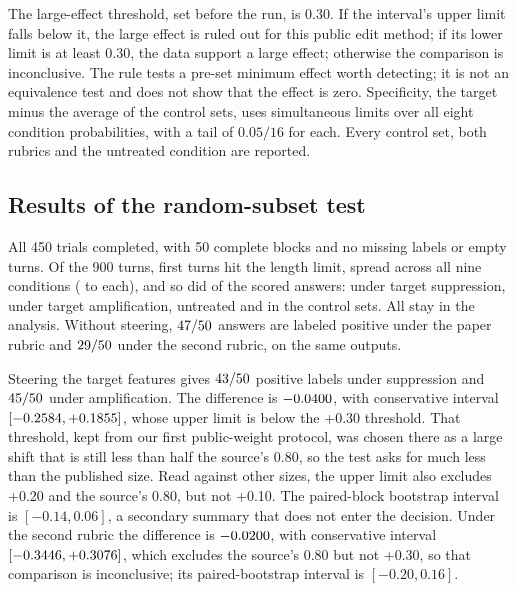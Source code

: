 The large-effect threshold, set before the run, is 0.30. If the interval's
upper limit falls below it, the large effect is ruled out for this public
edit method; if its lower limit is at least 0.30, the data support a large
effect; otherwise the comparison is inconclusive. The rule tests a pre-set
minimum effect worth detecting; it is not an equivalence test and does not
show that the effect is zero. Specificity, the target minus the average of
the control sets, uses simultaneous limits over all eight condition
probabilities, with a tail of $0.05/16$ for each. Every control set, both
rubrics and the untreated condition are reported.

\subsection{Results of the random-subset test}
\label{sec:ensemble-results}

All 450 trials completed, with 50 complete blocks and no missing labels or
empty turns. Of the 900 turns, \SteeringTruncContinuationCapped{} first turns
hit the length limit, spread across all nine conditions
(\SteeringTruncContinuationArmLow{} to \SteeringTruncContinuationArmHigh{}
each), and so did \SteeringTruncAnswerCapped{} of the scored answers:
\SteeringTruncTargetSuppressionCapped{} under target suppression,
\SteeringTruncTargetAmplificationCapped{} under target amplification,
\SteeringTruncZeroCapped{} untreated and \SteeringTruncControlCapped{} in the
control sets. All stay in the analysis. Without steering,
$47{}/50{}$ answers are labeled
positive under the paper rubric and
$29{}/50{}$ under the
second rubric, on the same outputs.

Steering the target features gives
$43{}/50{}$
positive labels under suppression and
$45{}/50{}$
under amplification. The difference is $-0.0400{}$, with
conservative interval
$[-0.2584{},+0.1855{}]$, whose upper
limit is below the +0.30 threshold. That threshold, kept from our first
public-weight protocol, was chosen there as a large shift that is still less
than half the source's 0.80, so the test asks for much less than the
published size. Read against other sizes, the upper limit also excludes +0.20
and the source's 0.80, but not +0.10. The paired-block bootstrap interval is
$[-0.14,0.06]$, a secondary summary that does not enter the decision. Under
the second rubric the difference is $-0.0200{}$, with
conservative interval
$[-0.3446{},+0.3076{}]$, which
excludes the source's 0.80 but not +0.30, so that comparison is
inconclusive; its paired-bootstrap interval is $[-0.20,0.16]$.

